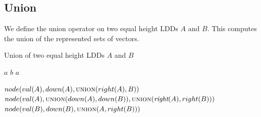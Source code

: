 \documentclass{article}
\newcommand{\var}[1]{\ensuremath{\textit{#1}}}
\newcommand{\lddright}{\textit{right}}
\begin{document}
\subsection{Union}

We define the union operator on two equal height LDDs $A$ and $B$.
This computes the union of the represented sets of vectors.

\begin{algorithm}[h]
\caption{Union of two equal height LDDs $\var{A}$ and $\var{B}$}
\begin{algorithmic}[1]
	\State \Return $a$
	\State \Return $b$
	\State \Return $a$
\EndIf

	\State \Return $node(val(A), down(A), \textsc{union}(right(A), B))$
	\State \Return $node(val(A), \textsc{union}(down(A), down(B)), \textsc{union}(\lddright(A), right(B)))$
	\State \Return $node(val(B), down(B), \textsc{union}(A, right(B)))$	
\EndIf

\EndFunction
\end{algorithmic}
\end{algorithm}
\end{document}
